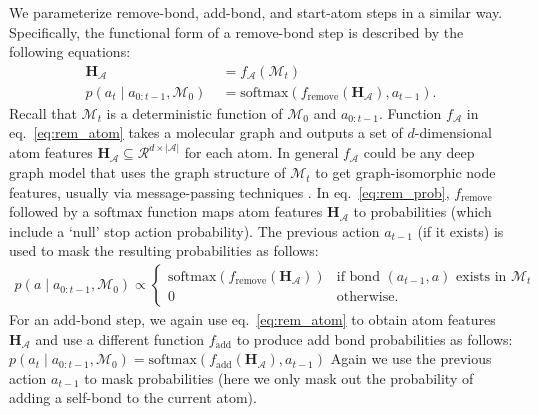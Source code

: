 \documentclass{article}
\newcommand{\Mc}{{\mathcal{M}}}
\newcommand{\Bc}{{\mathcal{B}}}
\newcommand{\Ac}{{\mathcal{A}}}
\newcommand{\Hb}{{\mathbf{H}}}
\begin{document}
We parameterize remove-bond, add-bond, and start-atom steps in a similar way. Specifically, the functional form of a remove-bond step is described by the following equations:
\begin{align}
\Hb_{\Ac} \;&= f_{\Ac}(\Mc_t) \label{eq:rem_atom} \\
p(a_t \mid a_{0:t-1}, \Mc_0) \;&= \mbox{softmax}(f_{\textrm{remove}}(\Hb_{\Ac}), a_{t-1}). \label{eq:rem_prob}  %
\end{align}
Recall that $\Mc_t$ is a deterministic function of $\Mc_0$ and $a_{0:t-1}$.
Function $f_{\Ac}$ in eq.~\eqref{eq:rem_atom} takes a molecular graph and outputs a set of $d$-dimensional atom features $\Hb_{\Ac} \subseteq \mathcal{R}^{d \times |\Ac|}$ for each atom. In general $f_{\Ac}$ could be any deep graph model that uses the graph structure of $\Mc_t$ to get graph-isomorphic node features, usually via message-passing techniques \citep{gilmer2017neural}.
In eq.~\eqref{eq:rem_prob}, $f_{\textrm{remove}}$ followed by a $\mbox{softmax}$ function maps atom features $\Hb_{\Ac}$ to probabilities (which include a `null' stop action probability). The previous action $a_{t-1}$ (if it exists) is used to mask the resulting probabilities as follows:
\begin{align}
p(a \mid a_{0:t-1}, \Mc_0) \propto 
\begin{cases}
\mbox{softmax}(f_{\textrm{remove}}(\Hb_{\Ac})) & \mbox{if bond } (a_{t-1},a) \mbox{ exists in } \Mc_t \\
0 & \mbox{otherwise}. \nonumber
\end{cases}
\end{align}
For an add-bond step, we again use eq.~\eqref{eq:rem_atom} to obtain atom features $\Hb_{\Ac}$ and use a different function $f_{\textrm{add}}$ to produce add bond probabilities as follows: $p(a_t \mid a_{0:t-1}, \Mc_0) = \mbox{softmax}(f_{\textrm{add}}(\Hb_{\Ac}), a_{t-1})$
Again we use the previous action $a_{t-1}$ to mask probabilities (here we only mask out the probability of adding a self-bond to the current atom).
\end{document}
